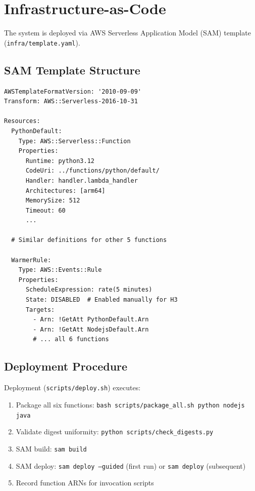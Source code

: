 \section{Infrastructure-as-Code}

The system is deployed via AWS Serverless Application Model (SAM) template (\texttt{infra/template.yaml}).

\subsection{SAM Template Structure}

\begin{verbatim}
AWSTemplateFormatVersion: '2010-09-09'
Transform: AWS::Serverless-2016-10-31

Resources:
  PythonDefault:
    Type: AWS::Serverless::Function
    Properties:
      Runtime: python3.12
      CodeUri: ../functions/python/default/
      Handler: handler.lambda_handler
      Architectures: [arm64]
      MemorySize: 512
      Timeout: 60
      ...
  
  # Similar definitions for other 5 functions
  
  WarmerRule:
    Type: AWS::Events::Rule
    Properties:
      ScheduleExpression: rate(5 minutes)
      State: DISABLED  # Enabled manually for H3
      Targets:
        - Arn: !GetAtt PythonDefault.Arn
        - Arn: !GetAtt NodejsDefault.Arn
        # ... all 6 functions
\end{verbatim}

\subsection{Deployment Procedure}

Deployment (\texttt{scripts/deploy.sh}) executes:

\begin{enumerate}
    \item Package all six functions: \texttt{bash scripts/package\_all.sh python nodejs java}
    \item Validate digest uniformity: \texttt{python scripts/check\_digests.py}
    \item SAM build: \texttt{sam build}
    \item SAM deploy: \texttt{sam deploy --guided} (first run) or \texttt{sam deploy} (subsequent)
    \item Record function ARNs for invocation scripts
\end{enumerate}

